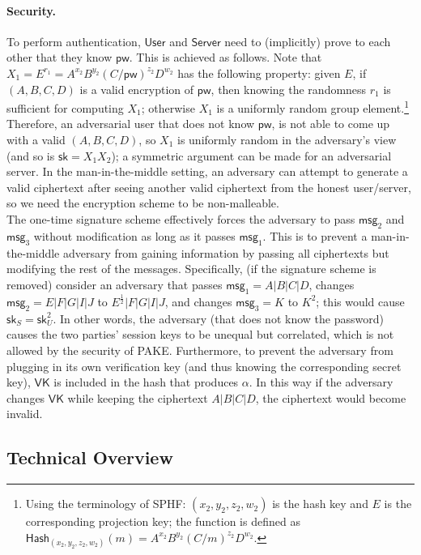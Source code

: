 \documentclass[12pt,a4paper]{article}
\newcommand{\user}{\mathsf{User}}
\newcommand{\sk}{\mathsf{sk}}
\newcommand{\pw}{\mathsf{pw}}
\newcommand{\VK}{\mathsf{VK}}
\newcommand{\server}{\mathsf{Server}}
\newcommand{\msg}[1]{\mathsf{msg}_{#1}}
\begin{document}
\paragraph{Security.}
To perform authentication, $\user$ and $\server$ need to (implicitly) prove to each other that they know $\pw$. This is achieved as follows. Note that $X_1 = E^{r_1} = A^{x_2}B^{y_2}(C/\pw)^{z_2}D^{w_2}$ has the following property: given $E$, if $(A,B,C,D)$ is a valid encryption of $\pw$, then knowing the randomness $r_1$ is sufficient for computing $X_1$; otherwise $X_1$ is a uniformly random group element.\footnote{Using the terminology of SPHF: $(x_2,y_2,z_2,w_2)$ is the hash key and $E$ is the corresponding projection key; the function is defined as $\mathsf{Hash}_{(x_2,y_2,z_2,w_2)}(m) = A^{x_2}B^{y_2}(C/m)^{z_2}D^{w_2}$.} Therefore, an adversarial user that does not know $\pw$, is not able to come up with a valid $(A,B,C,D)$, so $X_1$ is uniformly random in the adversary's view (and so is $\sk = X_1X_2$); a symmetric argument can be made for an adversarial server. In the man-in-the-middle setting, an adversary can attempt to generate a valid ciphertext after seeing another valid ciphertext from the honest user/server, so we need the encryption scheme to be non-malleable.\\

The one-time signature scheme effectively forces the adversary to pass $\msg{2}$ and $\msg{3}$ without modification as long as it passes $\msg{1}$. This is to prevent a man-in-the-middle adversary from gaining information by passing all ciphertexts but modifying the rest of the messages. Specifically, (if the signature scheme is removed) consider an adversary that passes $\msg{1} = A|B|C|D$, changes $\msg{2} = E|F|G|I|J$ to $E^{\frac{1}{2}}|F|G|I|J$, and changes $\msg{3} = K$ to $K^2$; this would cause $\sk_S = \sk_U^2$. In other words, the adversary (that does not know the password) causes the two parties' session keys to be unequal but correlated, which is not allowed by the security of PAKE. Furthermore, to prevent the adversary from plugging in its own verification key (and thus knowing the corresponding secret key), $\VK$ is included in the hash that produces $\alpha$. In this way if the adversary changes $\VK$ while keeping the ciphertext $A|B|C|D$, the ciphertext would become invalid.
	
	\subsection{Technical Overview}
\end{document}
